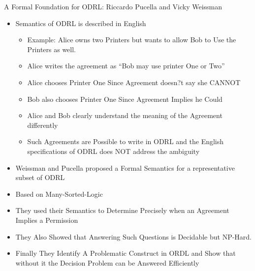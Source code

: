 \documentclass{beamer}
\begin{document}
\begin{frame}[fragile]{A Formal Foundation for ODRL: \newline Riccardo Pucella and Vicky Weissman}
\Large
\begin{itemize}
\item Semantics of ODRL is described in English
   \begin{itemize}
      \item Example: Alice owns two Printers but wants to allow Bob to Use the Printers as well. 
      \item Alice writes the agreement as ``Bob may use printer One or Two''
      \item Alice chooses Printer One Since Agreement doesn?t say she CANNOT
      \item Bob also chooses Printer One Since Agreement Implies he Could
      \item Alice and Bob clearly understand the meaning of the Agreement differently
      \item Such Agreements are Possible to write in ODRL and the English specifications of ODRL does NOT address the ambiguity
    \end{itemize}

\item Weissman and Pucella proposed a Formal Semantics for a representative subset of ODRL
\item Based on Many-Sorted-Logic
\item They used their Semantics to Determine Precisely when an Agreement Implies a Permission
\item They Also Showed that Answering Such Questions is Decidable but NP-Hard.
\item Finally They Identify A Problematic Construct in ORDL and Show that without it the Decision Problem can be Answered Efficiently

\end{itemize}
\end{frame}
\end{document}
